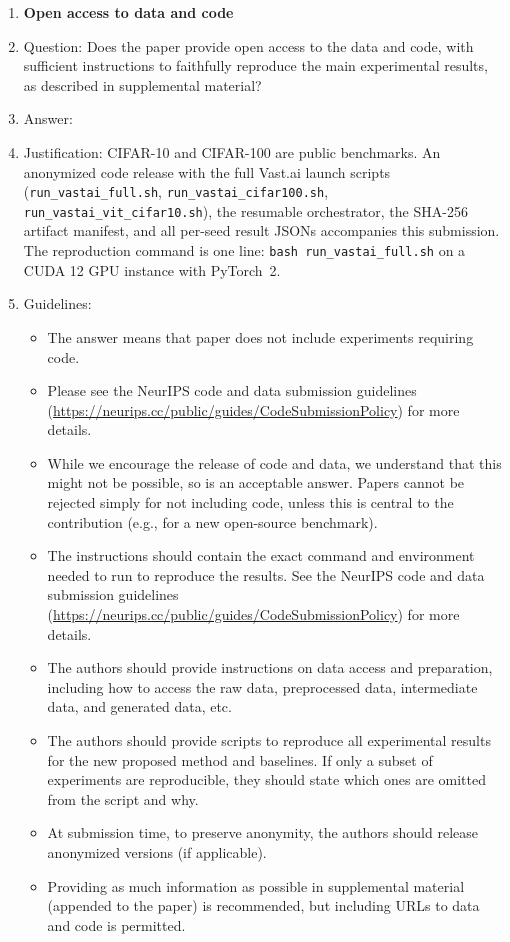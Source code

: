 \begin{enumerate}
\item {\bf Open access to data and code}
    \item[] Question: Does the paper provide open access to the data and code, with sufficient instructions to faithfully reproduce the main experimental results, as described in supplemental material?
    \item[] Answer: \answerYes{}
    \item[] Justification: CIFAR-10 and CIFAR-100 are public benchmarks. An anonymized code release with the full Vast.ai launch scripts (\texttt{run\_vastai\_full.sh}, \texttt{run\_vastai\_cifar100.sh}, \texttt{run\_vastai\_vit\_cifar10.sh}), the resumable orchestrator, the SHA-256 artifact manifest, and all per-seed result JSONs accompanies this submission. The reproduction command is one line: \texttt{bash run\_vastai\_full.sh} on a CUDA 12 GPU instance with PyTorch~2.
    \item[] Guidelines:
    \begin{itemize}
        \item The answer \answerNA{} means that paper does not include experiments requiring code.
        \item Please see the NeurIPS code and data submission guidelines (\url{https://neurips.cc/public/guides/CodeSubmissionPolicy}) for more details.
        \item While we encourage the release of code and data, we understand that this might not be possible, so \answerNo{} is an acceptable answer. Papers cannot be rejected simply for not including code, unless this is central to the contribution (e.g., for a new open-source benchmark).
        \item The instructions should contain the exact command and environment needed to run to reproduce the results. See the NeurIPS code and data submission guidelines (\url{https://neurips.cc/public/guides/CodeSubmissionPolicy}) for more details.
        \item The authors should provide instructions on data access and preparation, including how to access the raw data, preprocessed data, intermediate data, and generated data, etc.
        \item The authors should provide scripts to reproduce all experimental results for the new proposed method and baselines. If only a subset of experiments are reproducible, they should state which ones are omitted from the script and why.
        \item At submission time, to preserve anonymity, the authors should release anonymized versions (if applicable).
        \item Providing as much information as possible in supplemental material (appended to the paper) is recommended, but including URLs to data and code is permitted.
    \end{itemize}



\end{enumerate}
